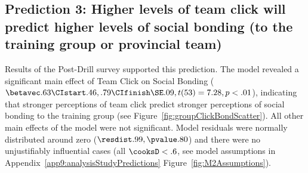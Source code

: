 \begin{CJK}{UTF8}{gbsn}


\subsection{Prediction 3: Higher levels of team click will predict higher levels of social bonding (to the training group or provincial team)}


Results of the Post-Drill survey supported this prediction. The model revealed a significant main effect of Team Click on Social Bonding ($\betavec .63 \CIstart .46, .79 \CIfinish \SE .09, t(53) = 7.28, p < .01$), indicating that stronger perceptions of team click predict stronger perceptions of social bonding to the training group (see Figure~\ref{fig:groupClickBondScatter}).  All other main effects of the model were not significant.  Model residuals were normally distributed around zero ($\resdist .99, \pvalue .80$) and there were no unjustifiably influential cases (all $\cooksD < .6$, see model assumptions in Appendix~\ref{app9:analysisStudyPredictions} Figure~\ref{fig:M2Assumptions}).








\end{CJK}
